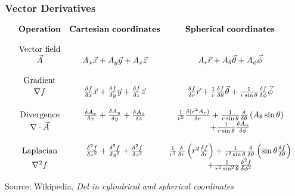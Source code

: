 \documentclass{beamer}
\begin{document}
\begin{frame}
\frametitle{Vector Derivatives}

\[
\begin{array}{ccc}
 {\bf Operation}      & {\bf Cartesian\ coordinates}  & {\bf Spherical\ coordinates} \\
& & \\
 {\rm Vector\ field}\\ \vec{A} & A_x \vec{x} + A_y \vec{y} + A_z \vec{z} & A_r \vec{r} + A_\theta \vec{\theta} + A_\phi \vec{\phi} \\
& & \\
 {\rm Gradient} \\ \nabla f & \frac{\delta f}{\delta x}\vec{x} + \frac{\delta f}{\delta y}\vec{y} + \frac{\delta f}{\delta z}\vec{z} & \frac{\delta f}{\delta r}\vec{r} + \frac{1}{r} \frac{\delta f}{\delta \theta}\vec{\theta} + \frac{1}{r \sin\theta}\frac{\delta f}{\delta \phi}\vec{\phi} \\

& & \\
 {\rm Divergence}  & \frac{\delta A_x}{\delta x} + \frac{\delta A_y}{\delta y} + \frac{\delta A_z}{\delta z} & \frac{1}{r^2} \frac{\delta (r^2 A_r)}{\delta r} + \frac{1}{r \sin \theta} \frac{\delta}{\delta \theta}\left(A_\theta \sin\theta\right)\\
\nabla \cdot \vec{A}  & & + \frac{1}{r \sin\theta}\frac{\delta A_\phi}{\delta \phi} \\

& & \\
 {\rm Laplacian} & \frac{\delta^2 f}{\delta x^2} + \frac{\delta^2 f}{\delta y^2} + \frac{\delta^2 f}{\delta z^2} &   \frac{1}{r^2} \frac{\delta}{\delta r}\left(r^2\frac{\delta f}{\delta r}\right) + \frac{1}{r^2\sin\theta} \frac{\delta}{\delta \theta}\left(\sin\theta\frac{\delta f}{\delta\theta}\right) \\
\nabla^2 f  & & + \frac{1}{r^2 \sin^2\theta}\frac{\delta^2 f}{\delta \phi^2} \\

\end{array}
\]

Source: Wikipedia, {\it Del in cylindrical and spherical coordinates}

\end{frame}
\end{document}
